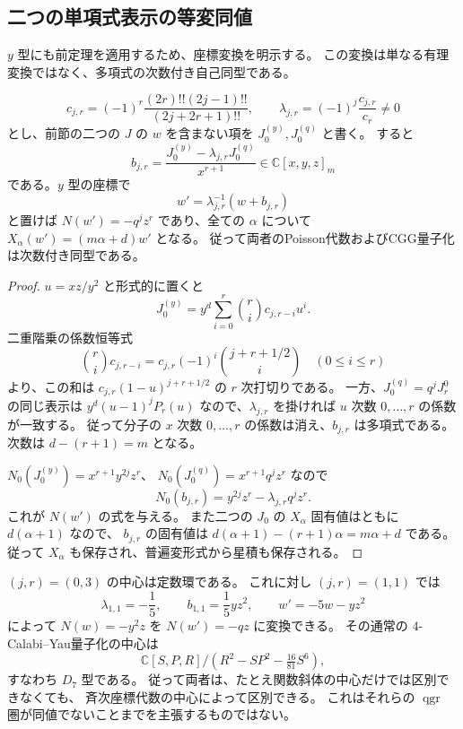 \subsection{二つの単項式表示の等変同値}

$y$ 型にも前定理を適用するため、座標変換を明示する。
この変換は単なる有理変換ではなく、多項式の次数付き自己同型である。

\begin{proposition}[二つの表示は同じアフィン作用を与える]
\label{prop:affine-q-y-conjugacy-v34}
\[
 c_{j,r}=(-1)^r\frac{(2r)!!(2j-1)!!}{(2j+2r+1)!!},\qquad
 \lambda_{j,r}=(-1)^j\frac{c_{j,r}}{c_r}\ne0
\]
とし、前節の二つの $J$ の $w$ を含まない項を $J_0^{(y)},J_0^{(q)}$ と書く。
すると
\[
 b_{j,r}=\frac{J_0^{(y)}-\lambda_{j,r}J_0^{(q)}}{x^{r+1}}
 \in\mathbb C[x,y,z]_m
\]
である。$y$ 型の座標で
\[
 w'=\lambda_{j,r}^{-1}(w+b_{j,r})
\]
と置けば $N(w')=-q^jz^r$ であり、全ての $\alpha$ について
$X_\alpha(w')=(m\alpha+d)w'$ となる。
従って両者のPoisson代数およびCGG量子化は次数付き同型である。
\end{proposition}

\begin{proof}
$u=xz/y^2$ と形式的に置くと
\[
 J_0^{(y)}=y^d\sum_{i=0}^r\binom ri c_{j,r-i}u^i.
\]
二重階乗の係数恒等式
\[
 \binom ri c_{j,r-i}
 =c_{j,r}(-1)^i\binom{j+r+1/2}{i}\quad(0\le i\le r)
\]
より、この和は $c_{j,r}(1-u)^{j+r+1/2}$ の $r$ 次打切りである。
一方、$J_0^{(q)}=q^jJ_r^0$ の同じ表示は
$y^d(u-1)^jP_r(u)$ なので、$\lambda_{j,r}$ を掛ければ
$u$ 次数 $0,\ldots,r$ の係数が一致する。
従って分子の $x$ 次数 $0,\ldots,r$ の係数は消え、$b_{j,r}$ は多項式である。
次数は $d-(r+1)=m$ となる。

$N_0(J_0^{(y)})=x^{r+1}y^{2j}z^r$、
$N_0(J_0^{(q)})=x^{r+1}q^jz^r$ なので
\[
 N_0(b_{j,r})=y^{2j}z^r-\lambda_{j,r}q^jz^r.
\]
これが $N(w')$ の式を与える。
また二つの $J_0$ の $X_\alpha$ 固有値はともに $d(\alpha+1)$ なので、
$b_{j,r}$ の固有値は $d(\alpha+1)-(r+1)\alpha=m\alpha+d$ である。
従って $X_\alpha$ も保存され、普遍変形式から星積も保存される。
\end{proof}

\begin{example}[重み三の二つのアフィン族]
$(j,r)=(0,3)$ の中心は定数環である。
これに対し $(j,r)=(1,1)$ では
\[
 \lambda_{1,1}=-\frac15,\qquad b_{1,1}=\frac15yz^2,\qquad
 w'=-5w-yz^2
\]
によって $N(w)=-y^2z$ を $N(w')=-qz$ に変換できる。
その通常の $4$-Calabi--Yau量子化の中心は
\[
 \mathbb C[S,P,R]/(R^2-SP^2-\tfrac{16}{81}S^6),
\]
すなわち $D_7$ 型である。
従って両者は、たとえ関数斜体の中心だけでは区別できなくても、
斉次座標代数の中心によって区別できる。
これはそれらの $\operatorname{qgr}$ 圏が同値でないことまでを主張するものではない。
\end{example}
